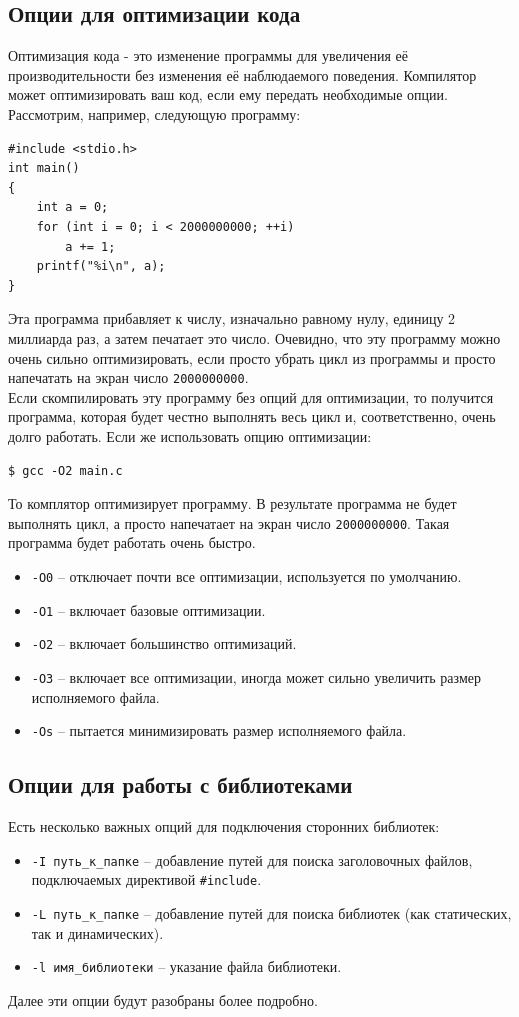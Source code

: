 \documentclass{article}
\begin{document}
\subsection*{Опции для оптимизации кода}
Оптимизация кода - это изменение программы для увеличения её производительности без изменения её наблюдаемого поведения. Компилятор может оптимизировать ваш код, если ему передать необходимые опции. Рассмотрим, например, следующую программу:
\begin{lstlisting}[style=csMiptCppStyle]
#include <stdio.h>
int main()
{
    int a = 0;
    for (int i = 0; i < 2000000000; ++i)
        a += 1;
    printf("%i\n", a);
}
\end{lstlisting}
Эта программа прибавляет к числу, изначально равному нулу, единицу 2 миллиарда раз, а затем печатает это число. Очевидно, что эту программу можно очень сильно оптимизировать, если просто убрать цикл из программы и просто напечатать на экран число \texttt{2000000000}.\\
Если скомпилировать эту программу без опций для оптимизации, то получится программа, которая будет честно выполнять весь цикл и, соответственно, очень долго работать. Если же использовать опцию оптимизации:
\begin{lstlisting}[style=csMiptBash]
$ gcc -O2 main.c
\end{lstlisting}
То комплятор оптимизирует программу. В результате программа не будет выполнять цикл, а просто напечатает на экран число \texttt{2000000000}. Такая программа будет работать очень быстро. 

\begin{itemize}
\item \texttt{-O0} -- отключает почти все оптимизации, используется по умолчанию.
\item \texttt{-O1} -- включает базовые оптимизации.
\item \texttt{-O2} -- включает большинство оптимизаций.
\item \texttt{-O3} -- включает все оптимизации, иногда может сильно увеличить размер исполняемого файла.
\item \texttt{-Os} -- пытается минимизировать размер исполняемого файла.
\end{itemize}

\subsection*{Опции для работы с библиотеками}
Есть несколько важных опций для подключения сторонних библиотек:
\begin{itemize}
\item \texttt{-I путь\_к\_папке} -- добавление путей для поиска заголовочных файлов, подключаемых директивой \texttt{\#include}.
\item \texttt{-L путь\_к\_папке} -- добавление путей для поиска библиотек (как статических, так и динамических).
\item \texttt{-l имя\_библиотеки} -- указание файла библиотеки.
\end{itemize}
Далее эти опции будут разобраны более подробно.
\end{document}

